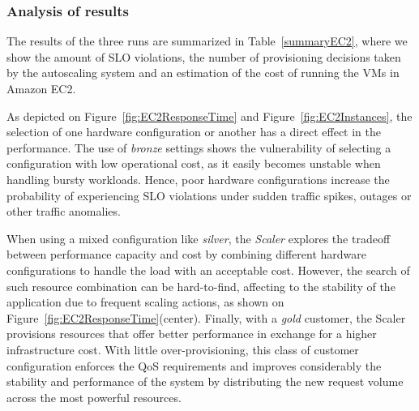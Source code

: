 \subsubsection{Analysis of results}
The results of the three runs are summarized in Table~\ref{summaryEC2}, where we show the amount of SLO violations, the number of provisioning decisions taken by the autoscaling system and an estimation of the cost of running the VMs in Amazon EC2.

As depicted on Figure~\ref{fig:EC2ResponseTime} and Figure~\ref{fig:EC2Instances}, the selection of one hardware configuration or another has a direct effect in the performance. The use of \emph{bronze} settings shows the vulnerability of selecting a configuration with low operational cost, as it easily becomes unstable when handling bursty workloads. Hence, poor hardware configurations increase the probability of experiencing SLO violations under sudden traffic spikes, outages or other traffic anomalies. 

When using a mixed configuration like \emph{silver}, the \emph{Scaler} explores the tradeoff between performance capacity and cost by combining different hardware configurations to handle the load with an acceptable cost. However, the search of such resource combination can be hard-to-find, affecting to the stability of the application due to frequent scaling actions, as shown on Figure~\ref{fig:EC2ResponseTime}(center). Finally, with a \emph{gold} customer, the Scaler provisions resources that offer better performance in exchange for a higher infrastructure cost. With little over-provisioning, this class of customer configuration enforces the QoS requirements and improves considerably the stability and performance of the system by distributing the new request volume across the most powerful resources.  






